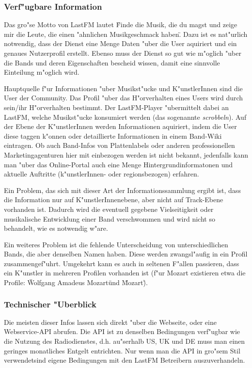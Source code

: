 \subsubsection{Verf"ugbare Information}
Das gro"se Motto von LastFM lautet \"Finde die Musik, die du magst und zeige mir die Leute, die einen "ahnlichen Musikgeschmack haben\". Dazu ist es nat"urlich notwendig, dass der Dienst eine Menge Daten "uber die User aquiriert und ein genaues Nutzerprofil erstellt. Ebenso muss der Dienst so gut wie m"oglich "uber die Bands und deren Eigenschaften bescheid wissen, damit eine sinnvolle Einteilung m"oglich wird.

Hauptquelle f"ur Informationen "uber Musikst"ucke und K"unstlerInnen sind die User der Community. Das Profil "uber das H"orverhalten eines Users wird durch sein/ihr H"orverhalten bestimmt. Der LastFM-Player "ubermittelt dabei an LastFM, welche Musikst"ucke konsumiert werden (das sogenannte \textit{scrobbeln}). Auf der Ebene der K"unstlerInnen werden Informationen aquiriert, indem die User diese taggen k"onnen oder detaillierte Informationen in einem Band-Wiki eintragen. Ob auch Band-Infos von Plattenlabels oder anderen professionellen Marketingagenturen hier mit einbezogen werden ist nicht bekannt, jedenfalls kann man "uber das Online-Portal auch eine Menge Hintergrundinformatonen und aktuelle Auftritte (k"unstlerInnen- oder regionsbezogen) erfahren. 

Ein Problem, das sich mit dieser Art der Informationssammlung ergibt ist, dass die Information nur auf K"unstlerInnenebene, aber nicht auf Track-Ebene vorhanden ist. Dadurch wird die eventuell gegebene Vielseitigkeit oder musikalische Entwicklung einer Band verschwommen und wird nicht so behandelt, wie es notwendig w"are. 

Ein weiteres Problem ist die fehlende Unterscheidung von unterschiedlichen Bands, die aber denselben Namen haben. Diese werden zwangsl"aufig in ein Profil zusammengef"uhrt. Umgekehrt kann es auch in seltenen F"allen passieren, dass ein K"unstler in mehreren Profilen vorhanden ist (f"ur Mozart existieren etwa die Profile: \"Wolfgang Amadeus Mozart\" und \"Mozart\").

\subsubsection{Technischer "Uberblick}
Die meisten dieser Infos lassen sich direkt "uber die Webseite, oder eine Webservice-API abrufen. Die API ist zu denselben Bedingungen verf"ugbar wie die Nutzung des Radiodienstes, d.h. au"serhalb US, UK und DE muss man einen geringes monatliches Entgelt entrichten. Nur wenn man die API in gro"sem Stil verwendetsind eigene Bedingungen mit den LastFM Betreibern auszuverhandeln.

